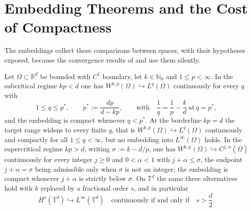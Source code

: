 \section{Embedding Theorems and the Cost of Compactness}

The embeddings collect these comparisons between spaces, with their hypotheses exposed, because the convergence results of  and  use them silently.

\begin{proposition}
\label{prop:ch02-sobolev-embeddings}
Let $\Omega \subset \mathbb{R}^d$ be bounded with $C^1$ boundary, let $k \in \mathbb{N}_0$ and $1 \le p < \infty$. In the subcritical regime $kp < d$ one has $W^{k,p}(\Omega) \hookrightarrow L^q(\Omega)$ continuously for every $q$ with
\begin{equation}
  1 \le q \le p^{*}, \qquad p^{*} := \frac{dp}{d - kp}, \qquad \text{with} \quad \frac{1}{q} = \frac{1}{p} - \frac{k}{d} \ \text{at} \ q = p^{*},
  \label{eq:ch02-sobembed}
\end{equation}
and the embedding is compact whenever $q < p^{*}$. At the borderline $kp = d$ the target range widens to every finite $q$, that is $W^{k,p}(\Omega) \hookrightarrow L^q(\Omega)$ continuously and compactly for all $1 \le q < \infty$, but no embedding into $L^\infty(\Omega)$ holds. In the supercritical regime $kp > d$, writing $\sigma := k - d/p$, one has $W^{k,p}(\Omega) \hookrightarrow C^{j,\alpha}(\overline{\Omega})$ continuously for every integer $j \ge 0$ and $0 < \alpha < 1$ with $j + \alpha \le \sigma$, the endpoint $j + \alpha = \sigma$ being admissible only when $\sigma$ is not an integer; the embedding is compact whenever $j + \alpha$ is strictly below $\sigma$. On $\mathbb{T}^d$ the same three alternatives hold with $k$ replaced by a fractional order $s$, and in particular
\begin{equation}
  H^s(\mathbb{T}^d) \hookrightarrow L^\infty(\mathbb{T}^d) \quad \text{continuously if and only if} \quad s > \frac{d}{2}.
  \label{eq:ch02-linfty-embed}
\end{equation}
\end{proposition}


